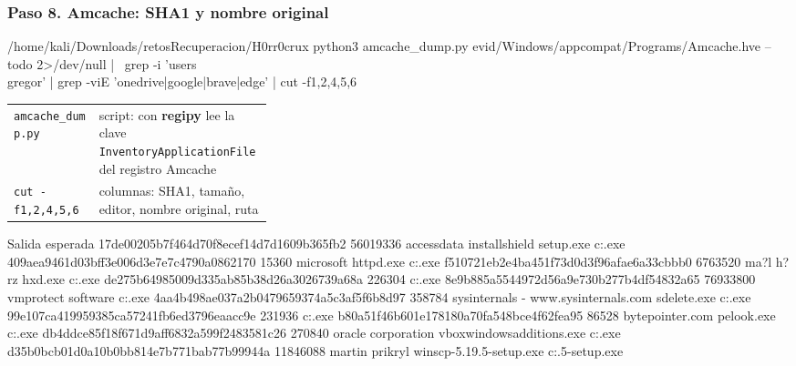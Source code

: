 \documentclass[11pt,a4paper]{article}
\begin{document}
\subsubsection*{Paso 8. Amcache: SHA1 y nombre original}
\begin{comando}{/home/kali/Downloads/retosRecuperacion/H0rr0crux}
python3 amcache_dump.py evid/Windows/appcompat/Programs/Amcache.hve --todo 2>/dev/null | \
  grep -i 'users\\gregor' | grep -viE 'onedrive|google|brave|edge' | cut -f1,2,4,5,6
\end{comando}
\begin{tcolorbox}[enhanced, breakable, colback=white, colframe=gray!40, boxrule=0.3pt, arc=1pt, left=4pt, right=4pt, top=2pt, bottom=2pt, fonttitle=\sffamily\scriptsize\bfseries, coltitle=black!75, colbacktitle=gray!8, title={Qué hace cada parte}, attach title to upper, before skip=2pt, after skip=4pt, fontupper=\small]
\par{\renewcommand{\arraystretch}{1.12}\begin{tabularx}{\linewidth}{@{}>{\raggedright\arraybackslash}p{0.33\linewidth}>{\raggedright\arraybackslash}X@{}}
\texttt{amcache\_\allowbreak{}dump.py} & script: con \textbf{regipy} lee la clave \texttt{InventoryApplicationFile} del registro Amcache \\
\texttt{cut -f1,\allowbreak{}2,\allowbreak{}4,\allowbreak{}5,\allowbreak{}6} & columnas: SHA1, tamaño, editor, nombre original, ruta \\
\end{tabularx}}
\end{tcolorbox}
\begin{salidan}{Salida esperada}
17de00205b7f464d70f8ecef14d7d1609b365fb2        56019336        accessdata      installshield setup.exe c:\users\gregor\desktop\ftk.exe
409aea9461d03bff3e006d3e7e7c4790a0862170        15360   microsoft       httpd.exe       c:\users\gregor\appdata\roaming\microsoft\windows\httpd.exe
f510721eb2e4ba451f73d0d3f96afae6a33cbbb0        6763520 ma?l h?rz       hxd.exe c:\users\gregor\desktop\hxd.exe
de275b64985009d335ab85b38d26a3026739a68a        226304                  c:\users\gregor\downloads\inject.exe
8e9b885a5544972d56a9e730b277b4df54832a65        76933800        vmprotect software                                                      c:\users\gregor\appdata\local\microsoft\packed.exe
4aa4b498ae037a2b0479659374a5c3af5f6b8d97        358784  sysinternals - www.sysinternals.com     sdelete.exe     c:\users\gregor\appdata\runas.exe
99e107ca419959385ca57241fb6ed3796eaacc9e        231936                  c:\users\gregor\appdata\local\temp\tor.exe
b80a51f46b601e178180a70fa548bce4f62fea95        86528   bytepointer.com pelook.exe      c:\users\gregor\appdata\local\microsoft\uninstall.exe
db4ddce85f18f671d9aff6832a599f2483581c26        270840  oracle corporation      vboxwindowsadditions.exe        c:\users\gregor\downloads\vboxwindowsadditions.exe
d35b0bcb01d0a10b0bb814e7b771bab77b99944a        11846088        martin prikryl                                                  winscp-5.19.5-setup.exe                                 c:\users\gregor\downloads{}.5-setup.exe
\end{salidan}
\end{document}
